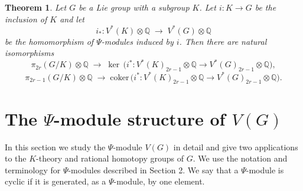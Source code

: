 \documentclass[twoside,a4paper,reqno,11pt]{amsart}
\newtheorem{theorem}[lemma]{Theorem}
\newcommand{\Q}{\mathbb{Q}}
\renewcommand{\o}{\otimes}
\newcommand{\coker}{\mathrm{coker}}
\begin{document}
\begin{theorem} \label{thm:psimodulehomsforinclusions}
Let $G$ be a Lie group with a subgroup $K$. Let $i : K \to G$ be the inclusion of $K$ and let
$$
i_* : V^*(K) \o \Q \; \to \; V^*(G)\o\Q
$$
be the homomorphism of $\Psi$-modules induced by $i$.  Then there are natural isomorphisms
$$
\pi_{2r}(G/K)\o \Q \; \longrightarrow \; \ker \, \Big(i^* : V^*(K)_{2r-1}\o\Q \to V^*(G)_{2r-1}\o\Q \Big),
$$
$$
\pi_{2r-1}(G/K)\o \Q \; \longrightarrow \; \coker \, \Big(i^* : V^*(K)_{2r-1}\o\Q \to V^*(G)_{2r-1}\o\Q \Big).
$$
\end{theorem}





\section{The $\Psi$-module structure of $V(G)$} \label{sec:Psimodule}
In this section we study the $\Psi$-module $V(G)$ in detail and give two applications to the $K$-theory and rational homotopy groups of $G$.  We use the notation and terminology for $\Psi$-modules described in Section 2. We say that a $\Psi$-module is cyclic if it is generated, as a $\Psi$-module, by one element.
\end{document}

